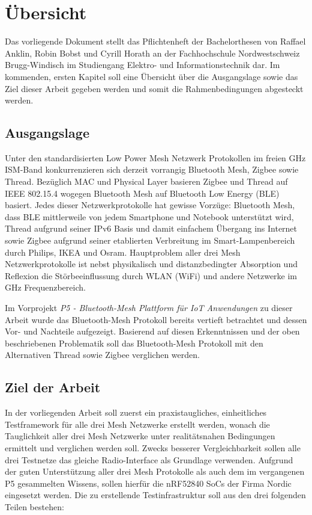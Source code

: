 	\clearpage
\section{Übersicht}\label{sec:Uebersicht}

Das vorliegende Dokument stellt das Pflichtenheft der Bachelorthesen von Raffael Anklin, Robin Bobst und Cyrill Horath an der Fachhochschule Nordwestschweiz Brugg-Windisch im Studiengang Elektro- und Informationstechnik dar. 
Im kommenden, ersten Kapitel soll eine Übersicht über die Ausgangslage sowie das Ziel dieser Arbeit gegeben werden und somit die Rahmenbedingungen abgesteckt werden.

\subsection{Ausgangslage}\label{subsec:Ausgangslage}

Unter den standardisierten Low Power Mesh Netzwerk Protokollen im
freien GHz ISM-Band konkurrenzieren sich derzeit vorrangig Bluetooth Mesh, Zigbee sowie Thread.
Bezüglich MAC und Physical Layer basieren Zigbee und Thread auf IEEE 802.15.4 wogegen Bluetooth Mesh auf Bluetooth Low Energy (BLE)
basiert.
Jedes dieser Netzwerkprotokolle hat gewisse Vorzüge: Bluetooth Mesh, dass BLE mittlerweile von jedem Smartphone und Notebook unterstützt wird, Thread aufgrund seiner IPv6 Basis und damit einfachem Übergang ins Internet sowie Zigbee aufgrund seiner etablierten Verbreitung im Smart-Lampenbereich durch Philips, IKEA und Osram.
Hauptproblem aller drei Mesh Netzwerkprotokolle ist nebst physikalisch und distanzbedingter Absorption und Reflexion die Störbeeinflussung durch WLAN (WiFi) und andere Netzwerke im GHz Frequenzbereich.

Im Vorprojekt \textit{P5 - Bluetooth-Mesh Plattform für IoT Anwendungen} zu dieser Arbeit wurde das Bluetooth-Mesh Protokoll bereits vertieft betrachtet und dessen Vor- und Nachteile aufgezeigt. Basierend auf diesen Erkenntnissen und der oben beschriebenen Problematik soll das Bluetooth-Mesh Protokoll mit den Alternativen Thread sowie Zigbee verglichen werden.

\subsection{Ziel der Arbeit}\label{subsec:ZielderArbeit}

In der vorliegenden Arbeit soll zuerst ein praxistaugliches, einheitliches Testframework für alle drei Mesh Netzwerke erstellt werden, wonach die Tauglichkeit aller drei Mesh Netzwerke unter realitätsnahen Bedingungen ermittelt und verglichen werden soll.
Zwecks besserer Vergleichbarkeit sollen alle drei Testnetze das gleiche Radio-Interface als Grundlage verwenden. Aufgrund der guten
Unterstützung aller drei Mesh Protokolle als auch dem im vergangenen P5 gesammelten Wissens, sollen hierfür die nRF52840 SoCs der Firma Nordic eingesetzt werden. Die zu erstellende Testinfrastruktur soll aus den drei folgenden Teilen bestehen:

